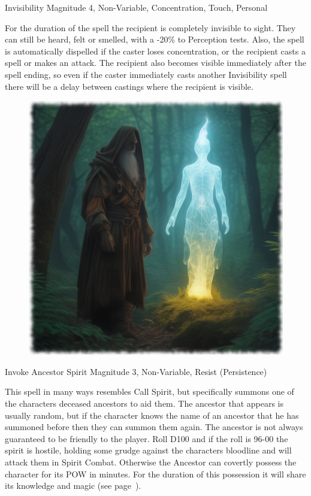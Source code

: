 \begin{rpg-spell}
{Invisibility}
{Magnitude 4, Non-Variable, Concentration, Touch, Personal}

For the duration of the spell the recipient is completely invisible to sight. They can still be heard, felt or smelled, with a -20\% to Perception tests. Also, the spell is automatically dispelled if the caster loses concentration, or the recipient casts a spell or makes an attack. The recipient also becomes visible immediately after the spell ending, so even if the caster immediately casts another Invisibility spell there will be a delay between castings where the recipient is visible.
\end{rpg-spell}

\begin{figure}[h]
\begin{center}
\includegraphics[scale=0.24]{img/ai-images/invoke-spirit.png}
\end{center}
\end{figure}

\begin{rpg-spell}
{Invoke Ancestor Spirit}
{Magnitude 3, Non-Variable, Resist (Persistence)}

This spell in many ways resembles Call Spirit, but specifically summons one of the characters deceased ancestors to aid them. The ancestor that appears is usually random, but if the character knows the name of an ancestor that he has summoned before then they can summon them again. The ancestor is not always guaranteed to be friendly to the player. Roll D100 and if the roll is 96-00 the spirit is hostile, holding some grudge against the characters bloodline and will attack them in Spirit Combat. Otherwise the Ancestor can covertly possess the character for its POW in minutes. For the duration of this possession it will share its knowledge and magic (see page~\pageref{sec:spirits}).
\end{rpg-spell}


